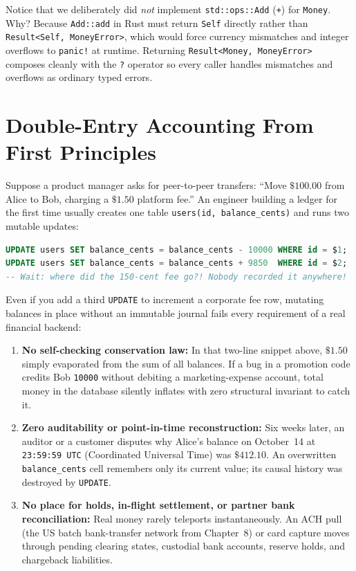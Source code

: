 Notice that we deliberately did \emph{not} implement \texttt{std::ops::Add} (\texttt{+}) for \texttt{Money}. Why? Because \texttt{Add::add} in Rust must return \texttt{Self} directly rather than \texttt{Result<Self, MoneyError>}, which would force currency mismatches and integer overflows to \texttt{panic!} at runtime. Returning \texttt{Result<Money, MoneyError>} composes cleanly with the \texttt{?} operator so every caller handles mismatches and overflows as ordinary typed errors.

\section{Double-Entry Accounting From First Principles}
\label{ch13:double-entry-accounting}

Suppose a product manager asks for peer-to-peer transfers: ``Move $\$100.00$ from Alice to Bob, charging a $\$1.50$ platform fee.'' An engineer building a ledger for the first time usually creates one table \texttt{users(id, balance\_cents)} and runs two mutable updates:
\begin{lstlisting}[language=SQL]
UPDATE users SET balance_cents = balance_cents - 10000 WHERE id = $1;
UPDATE users SET balance_cents = balance_cents + 9850  WHERE id = $2;
-- Wait: where did the 150-cent fee go?! Nobody recorded it anywhere!
\end{lstlisting}

Even if you add a third \texttt{UPDATE} to increment a corporate fee row, mutating balances in place without an immutable journal fails every requirement of a real financial backend:
\begin{enumerate}
  \item \textbf{No self-checking conservation law:} In that two-line snippet above, $\$1.50$ simply evaporated from the sum of all balances. If a bug in a promotion code credits Bob \texttt{10000} without debiting a marketing-expense account, total money in the database silently inflates with zero structural invariant to catch it.
  \item \textbf{Zero auditability or point-in-time reconstruction:} Six weeks later, an auditor or a customer disputes why Alice's balance on October~14 at \texttt{23:59:59 UTC} (Coordinated Universal Time) was $\$412.10$. An overwritten \texttt{balance\_cents} cell remembers only its current value; its causal history was destroyed by \texttt{UPDATE}.
  \item \textbf{No place for holds, in-flight settlement, or partner bank reconciliation:} Real money rarely teleports instantaneously. An ACH pull (the US batch bank-transfer network from Chapter~8) or card capture moves through pending clearing states, custodial bank accounts, reserve holds, and chargeback liabilities.
\end{enumerate}

